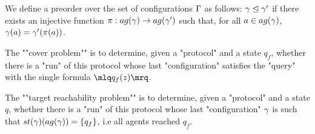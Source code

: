 \begin{definition}[Semantics]
	
	\begin{definition}
		We define a preorder over the set of configurations $\Gamma$ as follows: $\gamma \trianglelefteq \gamma'$ if there exists an injective function $\pi: \agentsof{\config} \rightarrow \agentsof{\config'}$ such that, for all $a \in \agentsof{\config}$, $\gamma(a) = \gamma'(\pi(a))$. 
	\end{definition}
	
%			
%			
%		

	\AP The ""cover problem"" is to determine, given a "protocol" and a state $q_f$, whether there is a "run" of this protocol whose last "configuration" satisfies the "query" with the single formula $\quotemarks{q_f(\var{z})}$.
	
	\AP The ""target reachability problem"" is to determine, given a "protocol" and a state $q$, whether there is a "run" of this protocol whose last "configuration" $\gamma$ is such that $\st{\config}(\agentsof{\gamma}) = \{q_f\}$, i.e all agents reached $q_f$.
	
	
\end{definition}

